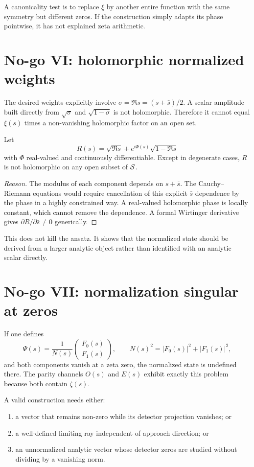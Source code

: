 A canonicality test is to replace $\xi$ by another entire function with the same symmetry but different zeros. If the construction simply adapts its phase pointwise, it has not explained zeta arithmetic.

\section{No-go VI: holomorphic normalized weights}

The desired weights explicitly involve $\sigma=\Re s=(s+\bar s)/2$. A scalar amplitude built directly from $\sqrt\sigma$ and $\sqrt{1-\sigma}$ is not holomorphic. Therefore it cannot equal $\xi(s)$ times a non-vanishing holomorphic factor on an open set.

\begin{proposition}
Let
\[
 R(s)=\sqrt{\Re s}+e^{i\Phi(s)}\sqrt{1-\Re s}
\]
with $\Phi$ real-valued and continuously differentiable. Except in degenerate cases, $R$ is not holomorphic on any open subset of $\mathcal{S}$.
\end{proposition}
\begin{proof}[Reason]
The modulus of each component depends on $s+\bar s$. The Cauchy--Riemann equations would require cancellation of this explicit $\bar s$ dependence by the phase in a highly constrained way. A real-valued holomorphic phase is locally constant, which cannot remove the dependence. A formal Wirtinger derivative gives $\partial R/\partial\bar s\neq0$ generically.
\end{proof}

This does not kill the ansatz. It shows that the normalized state should be derived from a larger analytic object rather than identified with an analytic scalar directly.

\section{No-go VII: normalization singular at zeros}

If one defines
\[
 \Psi(s)=\frac{1}{N(s)}\begin{pmatrix}F_0(s)\\F_1(s)\end{pmatrix},
 \qquad N(s)^2=|F_0(s)|^2+|F_1(s)|^2,
\]
and both components vanish at a zeta zero, the normalized state is undefined there. The parity channels $O(s)$ and $E(s)$ exhibit exactly this problem because both contain $\zeta(s)$.

A valid construction needs either:
\begin{enumerate}
  \item a vector that remains non-zero while its detector projection vanishes; or
  \item a well-defined limiting ray independent of approach direction; or
  \item an unnormalized analytic vector whose detector zeros are studied without dividing by a vanishing norm.
\end{enumerate}

